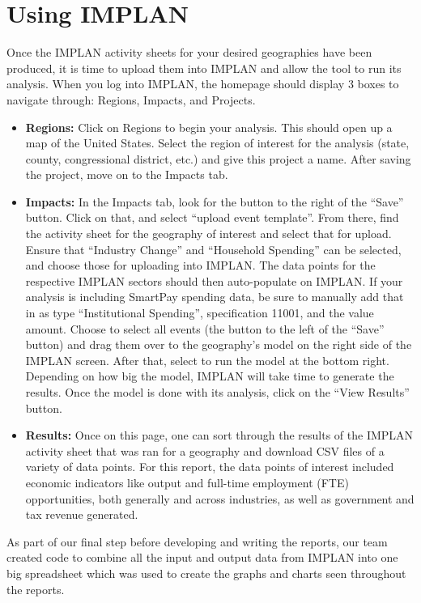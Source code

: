 \documentclass[
]{book}
\begin{document}
\hypertarget{using-implan}{%
\chapter{Using IMPLAN}\label{using-implan}}

Once the IMPLAN activity sheets for your desired geographies have been produced, it is time to upload them into IMPLAN and allow the tool to run its analysis. When you log into IMPLAN, the homepage should display 3 boxes to navigate through: Regions, Impacts, and Projects.

\begin{itemize}
\item
  \textbf{Regions:} Click on Regions to begin your analysis. This should open up a map of the United States. Select the region of interest for the analysis (state, county, congressional district, etc.) and give this project a name. After saving the project, move on to the Impacts tab.
\item
  \textbf{Impacts:} In the Impacts tab, look for the button to the right of the ``Save'' button. Click on that, and select ``upload event template''. From there, find the activity sheet for the geography of interest and select that for upload. Ensure that ``Industry Change'' and ``Household Spending'' can be selected, and choose those for uploading into IMPLAN. The data points for the respective IMPLAN sectors should then auto-populate on IMPLAN. If your analysis is including SmartPay spending data, be sure to manually add that in as type ``Institutional Spending'', specification 11001, and the value amount. Choose to select all events (the button to the left of the ``Save'' button) and drag them over to the geography's model on the right side of the IMPLAN screen. After that, select to run the model at the bottom right. Depending on how big the model, IMPLAN will take time to generate the results. Once the model is done with its analysis, click on the ``View Results'' button.
\item
  \textbf{Results:} Once on this page, one can sort through the results of the IMPLAN activity sheet that was ran for a geography and download CSV files of a variety of data points. For this report, the data points of interest included economic indicators like output and full-time employment (FTE) opportunities, both generally and across industries, as well as government and tax revenue generated.
\end{itemize}

As part of our final step before developing and writing the reports, our team created code to combine all the input and output data from IMPLAN into one big spreadsheet which was used to create the graphs and charts seen throughout the reports.
\end{document}
